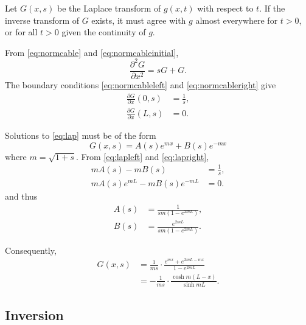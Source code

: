 \documentclass[parskip=half]{scrartcl}
\begin{document}
Let $G(x, s)$ be the Laplace transform of $g(x, t)$ with respect to $t$.
If the inverse transform of $G$ exists, it must agree with $g$ almost everywhere
for $t>0$, or for all $t>0$ given the continuity of $g$.

From
\eqref{eq:normcable} and \eqref{eq:normcableinitial},
\begin{equation}
    \label{eq:lap}
    \frac{\partial^2 G}{\partial x^2} = sG + G.
\end{equation}
The boundary conditions \eqref{eq:normcableleft} and \eqref{eq:normcableright} give
\begin{align}
    \label{eq:lapleft}
    \frac{\partial G}{\partial x}(0, s) & = \frac{1}{s},
    \\
    \label{eq:lapright}
    \frac{\partial G}{\partial x}(L, s) & = 0.
\end{align}

Solutions to \eqref{eq:lap} must be of the form
\begin{equation}
    G(x, s) = A(s) e^{mx} +B(s) e^{-mx}
\end{equation}
where $m=\sqrt{1+s}$. From \eqref{eq:lapleft} and \eqref{eq:lapright},
\begin{align*}
    mA(s) - mB(s) & = \frac{1}{s},
    \\
    mA(s)e^{mL} -mB(s)e^{-mL} & = 0.
\end{align*} and thus
\begin{align*}
    A(s) & = \frac{1}{sm (1-e^{2mL})},
    \\
    B(s) & = \frac{e^{2mL}}{sm (1-e^{2mL})}.
\end{align*}

Consequently,
\begin{equation}
    \begin{aligned}
	G(x, s) &= \frac{1}{ms}\cdot\frac{e^{mx}+e^{2mL-mx}}{1-e^{2mL}}\\
                &= - \frac{1}{ms}\cdot\frac{\cosh m(L-x)}{\sinh mL}.
    \end{aligned}
\end{equation}

\subsection*{Inversion}
\end{document}
